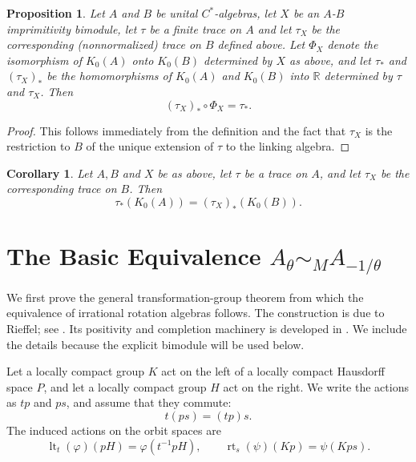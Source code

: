 \documentclass{book}
\newtheorem{proposition}[definition]{Proposition}
\newtheorem{corollary}[definition]{Corollary}
\def\cstars{\(C^*\)-algebras}
\begin{document}
\begin{proposition}\label{prop:TraceMoritaK0}
  Let \(A\) and \(B\) be unital \cstars, let \(X\) be an \(A\)-\(B\) imprimitivity bimodule,
  let \(\tau\) be a finite trace on \(A\) and let \(\tau_X\) be the corresponding (nonnormalized) trace
  on \(B\) defined above. Let \(\Phi_X\) denote the isomorphism of \(K_0(A)\) onto
  \(K_0(B)\) determined by \(X\) as above, and let \(\tau_*\) and \((\tau_X)_*\) be the 
  homomorphisms of \(K_0(A)\) and \(K_0(B)\) into \(\mathbb{R}\) determined by \(\tau\) and \(\tau_X\). Then
  \[
    (\tau_X)_*\circ\Phi_X=\tau_*.
  \]
\end{proposition}
\begin{proof}
  This follows immediately from the definition and the fact that \(\tau_X\) is the restriction to
  \(B\) of the unique extension of \(\tau\) to the linking algebra.
\end{proof}
\begin{corollary}\label{cor:TraceRangeMorita}
  Let \(A, B\) and \(X\) be as above, let \(\tau\) be a trace on \(A\), and let \(\tau_X\)
  be the corresponding trace on \(B\). Then
  \[
    \tau_*(K_0(A))=(\tau_X)_*(K_0(B)).
  \]
\end{corollary}

\section{The Basic Equivalence
  \texorpdfstring{\(A_\theta\sim_M A_{-1/\theta}\)}
  {A theta Morita equivalent to A -1/theta}}

We first prove the general transformation-group theorem from which the
equivalence of irrational rotation algebras follows.  The construction is due
to Rieffel; see \cite[Sections~1--2]{Rieffel1976}.  Its positivity and
completion machinery is developed in
\cite[Sections~4, 6--7]{Rieffel1974}.  We include the details because the
explicit bimodule will be used below.

Let a locally compact group \(K\) act on the left of a locally compact
Hausdorff space \(P\), and let a locally compact group \(H\) act on the right.
We write the actions as \(t p\) and \(p s\), and assume that they commute:
\[
  t(ps)=(tp)s.
\]
The induced actions on the orbit spaces are
\[
  \operatorname{lt}_t(\varphi)(pH)=\varphi(t^{-1}pH),
  \qquad
  \operatorname{rt}_s(\psi)(Kp)=\psi(Kps).
\]
\end{document}
